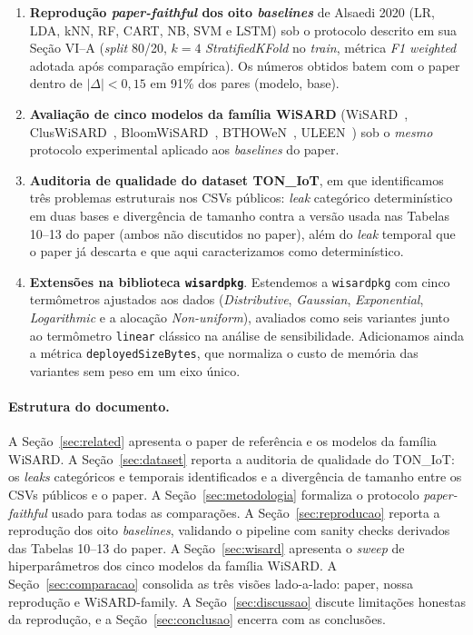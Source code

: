 \begin{enumerate}[leftmargin=*,itemsep=0pt]
  \item \textbf{Reprodução \emph{paper-faithful} dos oito
        \emph{baselines}} de Alsaedi 2020 (LR, LDA, kNN, RF, CART, NB,
        SVM e LSTM) sob o protocolo descrito em
        sua Seção VI--A (\emph{split} 80/20, $k=4$ \emph{StratifiedKFold}
        no \emph{train}, métrica \emph{F1 weighted} adotada após
        comparação empírica). Os números obtidos batem com o paper
        dentro de $|\Delta| < 0{,}15$ em 91\% dos pares
        (modelo, base).
  \item \textbf{Avaliação de cinco modelos da família WiSARD}
        (WiSARD~\cite{aleksander1984wisard},
        ClusWiSARD~\cite{cardoso2016cluswisard},
        BloomWiSARD~\cite{santiago2020bloomwisard},
        BTHOWeN~\cite{susskind2022bthowen},
        ULEEN~\cite{susskind2023uleen}) sob o \emph{mesmo} protocolo
        experimental aplicado aos \emph{baselines} do paper.
  \item \textbf{Auditoria de qualidade do dataset TON\_IoT}, em que
        identificamos três problemas estruturais nos CSVs públicos:
        \emph{leak} categórico determinístico em duas bases e divergência
        de tamanho contra a versão usada nas Tabelas 10--13 do paper
        (ambos não discutidos no paper), além do \emph{leak} temporal
        que o paper já descarta e que aqui caracterizamos como
        determinístico.
  \item \textbf{Extensões na biblioteca \texttt{wisardpkg}}. Estendemos a
        \texttt{wisardpkg} com cinco termômetros ajustados aos dados
        (\emph{Distributive}, \emph{Gaussian}, \emph{Exponential},
        \emph{Logarithmic} e a alocação \emph{Non-uniform}), avaliados
        como seis variantes junto ao termômetro \texttt{linear} clássico
        na análise de sensibilidade. Adicionamos ainda a métrica
        \texttt{deployedSizeBytes}, que normaliza o custo de memória das
        variantes sem peso em um eixo único.
\end{enumerate}

\paragraph{Estrutura do documento.}
A Seção~\ref{sec:related} apresenta o paper de referência e os modelos
da família WiSARD. A Seção~\ref{sec:dataset} reporta a auditoria de
qualidade do TON\_IoT: os \emph{leaks} categóricos e temporais
identificados e a divergência de tamanho entre os CSVs públicos e o
paper. A Seção~\ref{sec:metodologia} formaliza o protocolo
\emph{paper-faithful} usado para todas as comparações.
A Seção~\ref{sec:reproducao} reporta a reprodução dos oito
\emph{baselines}, validando o pipeline com sanity checks derivados das
Tabelas 10--13 do paper. A Seção~\ref{sec:wisard} apresenta o
\emph{sweep} de hiperparâmetros dos cinco modelos da família WiSARD.
A Seção~\ref{sec:comparacao} consolida as três visões
lado-a-lado: paper, nossa reprodução e WiSARD-family.
A Seção~\ref{sec:discussao} discute limitações honestas da reprodução,
e a Seção~\ref{sec:conclusao} encerra com as conclusões.
